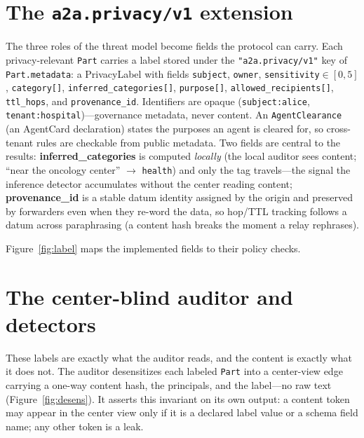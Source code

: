 \documentclass[sigconf,anonymous,review]{acmart}
\theoremstyle{acmplain}
\newcommand{\ext}{\texttt{a2a.privacy/v1}}
\begin{document}
\section{The \ext{} extension}\label{sec:ext}
The three roles of the threat model become fields the protocol can carry. Each
privacy-relevant \texttt{Part} carries a label stored under the
\texttt{"a2a.privacy/v1"} key of \texttt{Part.metadata}: a \textsf{PrivacyLabel}
with fields \texttt{subject}, \texttt{owner}, \texttt{sensitivity}${\in}[0,5]$,
\texttt{category[]}, \texttt{inferred\_categories[]}, \texttt{purpose[]},
\texttt{allowed\_recipients[]}, \texttt{ttl\_hops}, and \texttt{provenance\_id}.
Identifiers are opaque (\texttt{subject:alice}, \texttt{tenant:hospital})---governance
metadata, never content. An \texttt{AgentClearance} (an AgentCard declaration)
states the purposes an agent is cleared for, so cross-tenant rules are checkable
from public metadata. Two fields are central to the results:
\textbf{inferred\_categories} is computed \emph{locally} (the local auditor sees
content; ``near the oncology center'' $\rightarrow$ \texttt{health}) and only the
tag travels---the signal the inference detector accumulates without the center
reading content; \textbf{provenance\_id} is a stable datum identity assigned by the
origin and preserved by forwarders even when they re-word the data, so hop/TTL
tracking follows a datum across paraphrasing (a content hash breaks the moment a
relay rephrases).

Figure~\ref{fig:label} maps the implemented fields to their policy checks.


\section{The center-blind auditor and detectors}\label{sec:auditor}
These labels are exactly what the auditor reads, and the content is exactly what
it does not. The auditor desensitizes each labeled \texttt{Part} into a
center-view edge carrying a one-way content hash, the principals, and the
label---no raw text (Figure~\ref{fig:desens}). It
asserts this invariant on its own output: a content token may appear in the center
view only if it is a declared label value or a schema field name; any other token
is a leak.
\end{document}
